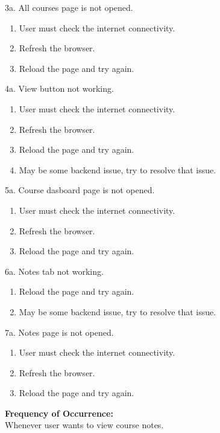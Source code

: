\documentclass[12pt]{article}
\begin{document}
3a. All courses page is not opened.
\begin{enumerate}
\item User must check the internet connectivity.
\item Refresh the browser.
\item Reload the page and try again.
\end{enumerate}
4a. View button not working.
\begin{enumerate}
\item User must check the internet connectivity.
\item Refresh the browser.
\item Reload the page and try again.
\item May be some backend issue, try to resolve that issue.
\end{enumerate}
5a. Course dasboard page is not opened.
\begin{enumerate}
\item User must check the internet connectivity.
\item Refresh the browser.
\item Reload the page and try again.
\end{enumerate}
6a. Notes tab not working.
\begin{enumerate}
\item Reload the page and try again.
\item May be some backend issue, try to resolve that issue.
\end{enumerate}
7a. Notes page is not opened.
\begin{enumerate}
\item User must check the internet connectivity.
\item Refresh the browser.
\item Reload the page and try again.
\end{enumerate}
\textbf{Frequency of Occurrence:}\\
Whenever user wants to view course notes.
\end{document}
